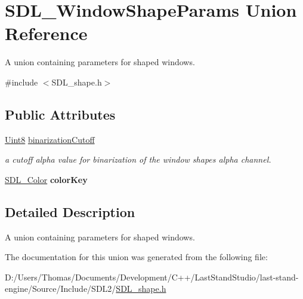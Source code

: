 \hypertarget{unionSDL__WindowShapeParams}{}\section{S\+D\+L\+\_\+\+Window\+Shape\+Params Union Reference}
\label{unionSDL__WindowShapeParams}


A union containing parameters for shaped windows.  




{\ttfamily \#include $<$S\+D\+L\+\_\+shape.\+h$>$}

\subsection*{Public Attributes}
\begin{DoxyCompactItemize}
\item 
\hypertarget{unionSDL__WindowShapeParams_a534c40b09588a8075c0a70227753dc56}{}\hyperlink{SDL__stdinc_8h_a2944638813a090aa23e62f4da842c3e2}{Uint8} \hyperlink{unionSDL__WindowShapeParams_a534c40b09588a8075c0a70227753dc56}{binarization\+Cutoff}\label{unionSDL__WindowShapeParams_a534c40b09588a8075c0a70227753dc56}

\begin{DoxyCompactList}\small\item\em a cutoff alpha value for binarization of the window shape\textquotesingle{}s alpha channel. \end{DoxyCompactList}\item 
\hypertarget{unionSDL__WindowShapeParams_a8bf3e442a51a1bbf452cfec7c1ed5318}{}\hyperlink{structSDL__Color}{S\+D\+L\+\_\+\+Color} {\bfseries color\+Key}\label{unionSDL__WindowShapeParams_a8bf3e442a51a1bbf452cfec7c1ed5318}

\end{DoxyCompactItemize}


\subsection{Detailed Description}
A union containing parameters for shaped windows. 

The documentation for this union was generated from the following file\+:\begin{DoxyCompactItemize}
\item 
D\+:/\+Users/\+Thomas/\+Documents/\+Development/\+C++/\+Last\+Stand\+Studio/last-\/stand-\/engine/\+Source/\+Include/\+S\+D\+L2/\hyperlink{SDL__shape_8h}{S\+D\+L\+\_\+shape.\+h}\end{DoxyCompactItemize}
